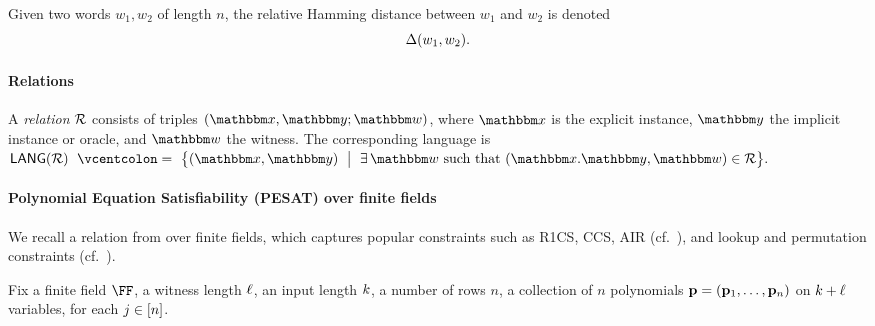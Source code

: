 \documentclass[11pt,letterpaper,usenames,dvipsnames]{article}
\begin{document}
Given two words $w_1, w_2$ of length $n$, the relative Hamming distance between $w_1$ and $w_2$ is denoted 
%
$$\Delta(w_1,w_2).$$

\paragraph{Relations}
A \emph{relation} $\mathcal{R}$ consists of triples  $(\inp,\oracle;\wit)$, where $\inp$ is the explicit instance, $\oracle$ the implicit instance or oracle, and $\wit$ the witness.  The corresponding language  is 
\(
  \LANG(\Relation)\ \defeq\ \bigl\{(\inp,\oracle)\ \bigm|\ \exists\,\wit \text{ such that } (\inp. \oracle,\wit)\in\Relation\bigr\}.
\)

\paragraph{Polynomial Equation Satisfiability (PESAT) over finite fields} We recall a relation from \cite{linear-accumulation}  over finite fields, which captures popular constraints such as R1CS, CCS, AIR (cf.\ \cite{linear accumulation}), and lookup and permutation constraints (cf.\ \cite{zinc}).

\newcommand{\PESAT}{\Relation_{\mathsf{PESAT}}}

Fix a finite field $\FF$, a witness length $\ell$, an input length $k$, a number of rows $n$, a collection of $n$ polynomials $\mathbf{p}=(\mathbf{p}_{1}, \ldots, \mathbf{p}_n)$ on $k+\ell$ variables, for each $j\in [n]$. 
\end{document}

